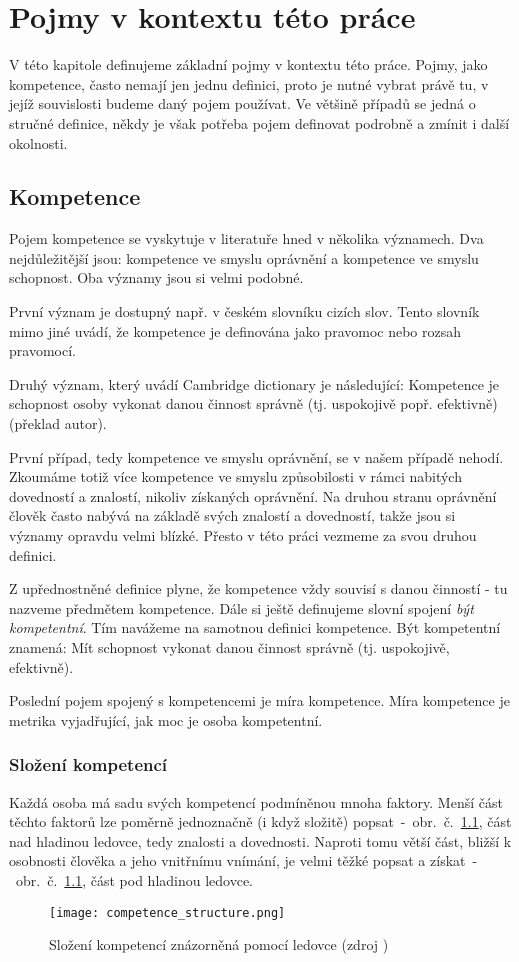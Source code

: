 \chapter{Pojmy v kontextu této práce}\label{sec:terms} %
V této kapitole definujeme základní pojmy v kontextu této práce. Pojmy, jako kompetence, často nemají jen jednu definici, proto je nutné vybrat právě tu, v jejíž souvislosti budeme daný pojem používat. Ve většině případů se jedná o stručné definice, někdy je však potřeba pojem definovat podrobně a zmínit i další okolnosti.
\section{Kompetence}
Pojem kompetence se vyskytuje v literatuře hned v několika významech. Dva nejdůležitější jsou: kompetence ve smyslu oprávnění a kompetence ve smyslu schopnost. Oba významy jsou si velmi podobné.\par
První význam je dostupný např. v českém slovníku cizích slov. Tento slovník mimo jiné uvádí, že kompetence je definována jako pravomoc nebo rozsah pravomocí.\cite{cite:06}\par
Druhý význam, který uvádí Cambridge dictionary je následující: Kompetence je schopnost osoby vykonat danou činnost správně (tj. uspokojivě popř. efektivně) \cite{cite:01} (překlad autor).\par
První případ, tedy kompetence ve smyslu oprávnění, se v našem případě nehodí. Zkoumáme totiž více kompetence ve smyslu způsobilosti v rámci nabitých dovedností a znalostí, nikoliv získaných oprávnění. Na druhou stranu oprávnění člověk často nabývá na základě svých znalostí a dovedností, takže jsou si významy opravdu velmi blízké. Přesto v této práci vezmeme za svou druhou definici.\par
Z upřednostněné definice plyne, že kompetence vždy souvisí s danou činností - tu nazveme předmětem kompetence. Dále si ještě definujeme slovní spojení \textit{být kompetentní}. Tím navážeme na samotnou definici kompetence. Být kompetentní znamená: Mít schopnost vykonat danou činnost správně (tj. uspokojivě, efektivně).\par
Poslední pojem spojený s kompetencemi je míra kompetence. Míra kompetence je metrika vyjadřující, jak moc je osoba kompetentní.
\subsection{Složení kompetencí}
Každá osoba má sadu svých kompetencí podmíněnou mnoha faktory. Menší část těchto faktorů lze poměrně jednoznačně (i když složitě) popsat~-~obr.~č.~\ref{fig:competence_structure}, část nad hladinou ledovce, tedy znalosti a dovednosti. Naproti tomu větší část, bližší k osobnosti člověka a jeho vnitřnímu vnímání, je velmi těžké popsat a získat~-~obr.~č.~\ref{fig:competence_structure}, část pod hladinou ledovce.
\begin{figure}[htbp!]
	\texttt{[image: competence\_structure.png]}
	\caption{Složení kompetencí znázorněná pomocí ledovce (zdroj \cite{cite:02})}
	\label{fig:competence_structure}
\end{figure}


